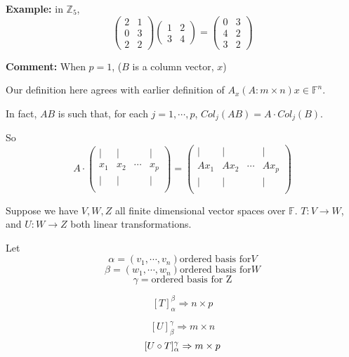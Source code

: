 \documentclass[12pt]{article}
\newcommand{\mZ}{{\mathbb{Z}}}
\newcommand{\mF}{{\mathbb{F}}}
\begin{document}
	{\color{Brown}
	\textbf{Example: } in $\mZ_5$, 
	\[
		\begin{pmatrix}
			2 & 1 \\
			0 & 3 \\
			2 & 2 
		\end{pmatrix}
		\begin{pmatrix}
			1 & 2 \\
			3 & 4
		\end{pmatrix}
		= 
		\begin{pmatrix}
			0 & 3 \\
			4 & 2 \\
			3 & 2
		\end{pmatrix}
	\]
	}

	\textbf{Comment: } When $p = 1$, ($B$ is a column vector, $x$)
	
	Our definition here agrees with earlier definition of $A_x (A : m\times n)
	x \in \mF^n$. 

	In fact, $AB$ is such that, for each $j = 1,\cdots, p$, 
	$Col_j(AB) = A\cdot Col_j(B)$. 
	
	So 
	\[
		A \cdot 
		\begin{pmatrix}
			| & | &  & |\\
			x_1 & x_2 & \cdots & x_p\\
			| & | &  & |\\
		\end{pmatrix}
		= \begin{pmatrix}
			| & | &  & |\\
			Ax_1 & Ax_2 & \cdots & Ax_p\\
			| & | &  & |\\
		\end{pmatrix}
	\]

	Suppose we have $V, W, Z$ all finite dimensional vector spaces over $\mF$. 
	$T:V\to W$, and $U:W\to Z$ both linear transformations. 

	Let 
	\[
		\alpha = (v_1,\cdots, v_n) \text{ordered basis for} V
	\]
	\[
		\beta = (w_1,\cdots, w_n) \text{ordered basis for}  W
	\]
	\[
		\gamma = \text{ordered basis for Z}
	\]

	\[
		[T]_{\alpha}^{\beta} \Rightarrow n \times p
	\]

	\[
		[U]_{\beta}^{\gamma} \Rightarrow m \times n
	\]
	\[
		[U\circ T]_{\alpha}^{\gamma} \Rightarrow m \times p\\
	\]
	
\end{document}
